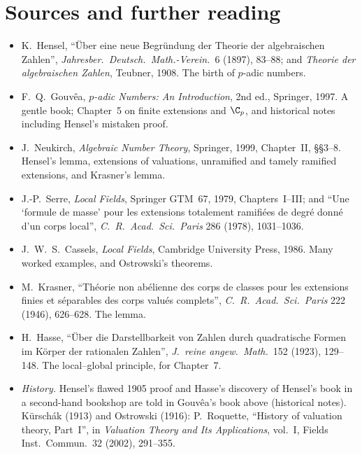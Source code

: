 \section*{Sources and further reading}

\begin{itemize}
\item K.~Hensel, ``\"Uber eine neue Begr\"undung der Theorie der algebraischen Zahlen'', \emph{Jahresber.\ Deutsch.\ Math.-Verein.}\
6 (1897), 83--88; and \emph{Theorie der algebraischen Zahlen}, Teubner, 1908. The birth of $p$-adic numbers.
\item F.~Q.~Gouv\^ea, \emph{$p$-adic Numbers: An Introduction}, 2nd ed., Springer, 1997. A gentle book; Chapter~5 on finite
extensions and $\C_p$, and historical notes including Hensel's mistaken proof.
\item J.~Neukirch, \emph{Algebraic Number Theory}, Springer, 1999, Chapter~II, \S\S3--8. Hensel's lemma, extensions of
valuations, unramified and tamely ramified extensions, and Krasner's lemma.
\item J.-P.~Serre, \emph{Local Fields}, Springer GTM~67, 1979, Chapters~I--III; and ``Une `formule de masse' pour les extensions
totalement ramifi\'ees de degr\'e donn\'e d'un corps local'', \emph{C.\ R.\ Acad.\ Sci.\ Paris} 286 (1978), 1031--1036.
\item J.~W.~S.~Cassels, \emph{Local Fields}, Cambridge University Press, 1986. Many worked examples, and Ostrowski's theorems.
\item M.~Krasner, ``Th\'eorie non ab\'elienne des corps de classes pour les extensions finies et s\'eparables des corps valu\'es
complets'', \emph{C.\ R.\ Acad.\ Sci.\ Paris} 222 (1946), 626--628. The lemma.
\item H.~Hasse, ``\"Uber die Darstellbarkeit von Zahlen durch quadratische Formen im K\"orper der rationalen Zahlen'', \emph{J.\
reine angew.\ Math.}\ 152 (1923), 129--148. The local--global principle, for Chapter~7.
\item \emph{History.} Hensel's flawed 1905 proof and Hasse's discovery of Hensel's book in a second-hand bookshop are told in
Gouv\^ea's book above (historical notes). K\"ursch\'ak (1913) and Ostrowski (1916): P.~Roquette, ``History of valuation
theory, Part~I'', in \emph{Valuation Theory and Its Applications}, vol.~I, Fields Inst.\ Commun.\ 32 (2002), 291--355.
\end{itemize}
